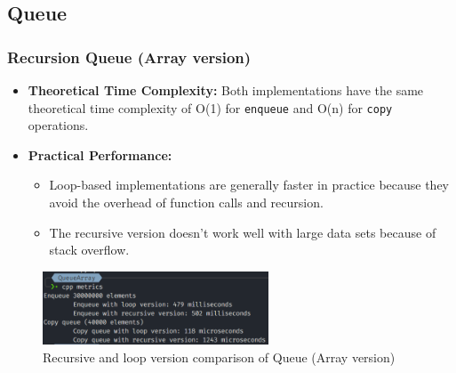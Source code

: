 \thispagestyle{empty}
\subsection{Queue}
\subsubsection*{Recursion Queue (Array version)}
\begin{itemize}
	\item \textbf{Theoretical Time Complexity:} Both implementations have the same theoretical time complexity of O(1) for \verb|enqueue| and O(n) for \verb|copy| operations.
	\item \textbf{Practical Performance:}
	      \begin{itemize}
		      \item  Loop-based implementations are generally faster in practice because they avoid the overhead of function calls and recursion.
		      \item The recursive version doesn't work well with large data sets because of stack overflow.
	      \end{itemize}
\end{itemize}
\begin{figure}[!ht]
	\centering
	\includegraphics[width=0.6\textwidth]{imgs/QueueArray/metrics.png}
	\caption{Recursive and loop version comparison of Queue (Array version)}\label{fig:queue_arr_metrics}
\end{figure}


